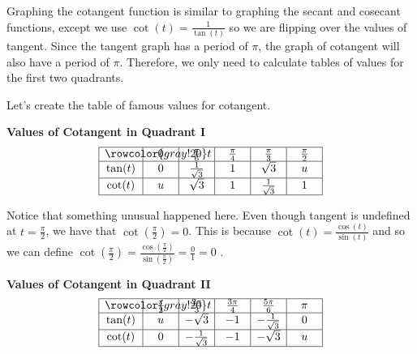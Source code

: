 \documentclass[nooutcomes, noauthor]{ximera}
\begin{document}
Graphing the cotangent function is similar to graphing the secant and cosecant functions, except we use $\cot(t)=\frac{1}{\tan(t)}$ so we are flipping over the values of tangent.  Since the tangent graph has a period of $\pi$, the graph of cotangent will also have a period of $\pi$.  Therefore, we only need to calculate tables of values for the first two quadrants.

Let's create the table of famous values for cotangent.

\begin{center}
\textbf{Values of Cotangent in Quadrant I}
\renewcommand*{\arraystretch}{2.5}
\setlength{\arrayrulewidth}{0.5mm}
\setlength{\tabcolsep}{18pt}
\[
\begin{array}{|>{\centering\arraybackslash$} p{1cm} <{$} | >{\centering\arraybackslash$} p{.75cm} <{$} |  >{\centering\arraybackslash$} p{.75cm} <{$} |  >{\centering\arraybackslash$} p{.75cm} <{$} |  >{\centering\arraybackslash$} p{.75cm} <{$} |  >{\centering\arraybackslash$} p{.75cm} <{$} |}
\hline 
\rowcolor{gray!20}
t & 0 & \frac{\pi}{6} & \frac{\pi}{4} & \frac{\pi}{3} & \frac{\pi}{2}\\
\hline
\tan(t) & 0 & \frac{1}{\sqrt{3}} &1 & \sqrt{3} & u\\
\hline
\cot(t) & u & \sqrt{3} & 1 & \frac{1}{\sqrt{3}}& 1\\
\hline 
\end{array}
\]
\end{center}

Notice that something unusual happened here.  Even though tangent is undefined at $t=\frac{\pi}{2}$, we have that $\cot\left(\frac{\pi}{2}\right)=0$.  This is because $\cot(t)=\frac{\cos(t)}{\sin(t)}$ and so we can define $\cot\left(\frac{\pi}{2}\right)=\frac{\cos\left(\frac{\pi}{2}\right)}{\sin\left(\frac{\pi}{2}\right)}=\frac{0}{1}=0$ .

\begin{center}
\textbf{Values of Cotangent in Quadrant II}
\renewcommand*{\arraystretch}{2.5}
\setlength{\arrayrulewidth}{0.5mm}
\setlength{\tabcolsep}{18pt}
\[
\begin{array}{|>{\centering\arraybackslash$} p{1cm} <{$} | >{\centering\arraybackslash$} p{.75cm} <{$} |  >{\centering\arraybackslash$} p{.75cm} <{$} |  >{\centering\arraybackslash$} p{.75cm} <{$} |  >{\centering\arraybackslash$} p{.75cm} <{$} |  >{\centering\arraybackslash$} p{.75cm} <{$} |}
\hline 
\rowcolor{gray!20}
t & \frac{\pi}{2} & \frac{2\pi}{3} & \frac{3\pi}{4} & \frac{5\pi}{6} & \pi\\
\hline
\tan(t) & u & -\sqrt{3} & -1 & -\frac{1}{\sqrt{3}} & 0\\
\hline
\cot(t) & 0 & -\frac{1}{\sqrt{3}}& -1 & -\sqrt{3} & u\\
\hline 
\end{array}
\]
\end{center}
\end{document}
